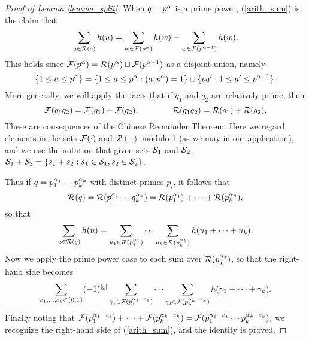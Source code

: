 \documentclass[oneside,11pt]{amsart}
\newcommand{\Rcal}{\mathcal{R}}
\begin{document}
\begin{proof}[Proof of Lemma \ref{lemma_split}]
When $q=p^\alpha$ is  a prime power, (\ref{arith_sum})
is the claim that
\[  \sum_{u \in \Rcal(q)} h(u) =   \sum_{w \in \Fcal(p^{\al} )} h(w) -  \sum_{w \in \Fcal(p^{\al-1} )} h(w) .\]
 This holds since $\Fcal(p^\al) = \Rcal(p^\al) \sqcup \Fcal(p^{\al-1})$ as a disjoint union,
namely
\[\{ 1 \leq a \leq p^\alpha \} = \{ 1 \leq a \leq p^\alpha : (a,p^\alpha)=1\} \sqcup \{ p a' : 1 \leq a' \leq p^{\alpha-1}\}.\]
   More generally,  we  will apply the facts that if $q_1$ and $q_2$ are relatively prime, then 
\[ \Fcal(q_1q_2) = \Fcal(q_1) + \Fcal(q_2), \qquad \qquad \Rcal(q_1q_2) = \Rcal(q_1) + \Rcal(q_2).\]
These are consequences of the Chinese Remainder Theorem. Here we regard elements in the sets $\mathcal{F}(\cdot)$ and $\Rcal(\cdot)$ modulo 1 (as we may in our application), and we use  the notation that given sets $\mathcal{S}_1$ and $\mathcal{S}_2$, $\mathcal{S}_1 + \mathcal{S}_2 = \{ s_1+ s_2 : s_1 \in \mathcal{S}_1, s_2 \in \mathcal{S}_2\}$.

Thus if $q=p_1^{\alpha_1} \cdots p_k^{\alpha_k}$ with distinct primes $p_i$, it follows that 
\[
 \Rcal(q) = \Rcal(p_1^{\al_1} \cdots q_k^{\al_k}) = \Rcal(p_1^{\al_1}) + \cdots + \Rcal(p_k^{\al_k}),
\]
so that
 \[ \sum_{u \in \Rcal(q)} h(u)  
 	 = \sum_{u_1 \in \Rcal(p_1^{\al_1})} \cdots \sum_{u_k \in \Rcal(p_k^{\al_k})} h(u_1 + \cdots +u_k).\]
 Now we apply the   prime power case to each sum over $\Rcal(p_j^{\al_j})$, so that the right-hand side becomes
 \[
      \sum_{\varepsilon_1, \ldots, \varepsilon_k \in \{0,1\}} (-1)^{|\underline{\varepsilon}|} 
       \sum_{\gamma_1 \in \mathcal{F}(p_1^{\alpha_1-\varepsilon_1})} \cdots \sum_{\gamma_1 \in \mathcal{F}(p_k^{\alpha_k - \varepsilon_k})} h(\gamma_1 + \cdots +\gamma_k).\]
Finally noting that $ \mathcal{F}(p_1^{\alpha_1-\varepsilon_1})+ \cdots +\mathcal{F}(p_k^{\alpha_k - \varepsilon_k}) = \mathcal{F}(p_1^{\alpha_1-\varepsilon_1} \cdots p_k^{\alpha_k - \varepsilon_k}), $
we recognize the right-hand side of (\ref{arith_sum}), and the identity is proved. 
\end{proof}
 

 
\end{document}

